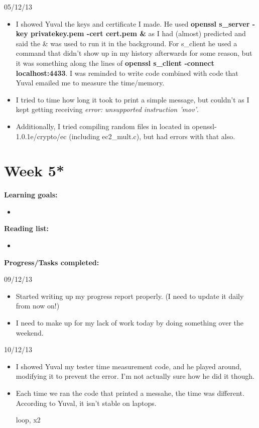 \documentclass[a4paper, 10pt, envcountsect, runningheads]{article}
\begin{document}
05/12/13 
\begin{itemize}
\item I showed Yuval the keys and certificate I made. He used \textbf{openssl s\_server -key privatekey.pem -cert cert.pem \&} as I had (almost) predicted and said the \& was used to run it in the background. For s\_client he used a command that didn't show up in my history afterwards for some reason, but it was something along the lines of \textbf{openssl s\_client -connect localhost:4433}. I was reminded to write code combined with code that Yuval emailed me to measure the time/memory.
\item I tried to time how long it took to print a simple message, but couldn't as I kept getting receiving \textit{error: unsupported instruction 'mov'}. 
\item Additionally, I tried compiling random files in located in openssl-1.0.1e/crypto/ec (including ec2\_mult.c), but had errors with that also.
\end{itemize}



\newpage
\section*{Week 5*}
\textbf{Learning goals:}
\begin{itemize}
\item 
\end{itemize}

\textbf{Reading list:}
\begin{itemize}
\item 
\end{itemize}

\textbf{Progress/Tasks completed:}

09/12/13
\begin{itemize}
\item Started writing up my progress report properly. (I need to update it daily from now on!)
\item I need to make up for my lack of work today by doing something over the weekend. 
\end{itemize}

10/12/13
\begin{itemize}
\item I showed Yuval my tester time measurement code, and he played around, modifying it to prevent the error. I'm not actually sure how he did it though.
\item Each time we ran the code that printed a messahe, the time was different. According to Yuval, it isn't stable on laptops. 

loop, x2

\end{itemize}
\end{document}

